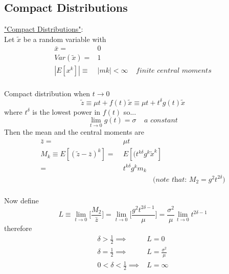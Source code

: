 \documentclass[
14pt,notheorems,hyperref={pdfauthor=whatever}
]{beamer}
\begin{document}
\subsection{Compact Distributions}

\begin{frame}
\underline{"Compact Distributions"}:\\
\hfill\break
Let $\tilde x$ be a random variable with\\
\begin{align*}
    \bar x =& 0\\
    Var(\tilde x) =& 1\\
    |E[x^k]| \equiv& |mk| < \infty \;\;\;\; \textit{finite central moments}\\
\end{align*}
\end{frame}

\begin{frame}
Compact distribution when $t \to 0$\\
\[\tilde z \equiv \mu t + f(t)\tilde x \equiv \mu t + t^\delta g(t) \tilde x\]
where $t^\delta$ is the lowest power in $f(t)$ so...\\
\[\lim_{t \to 0} g(t) = \sigma \;\;\;\; \textit{a constant}\]
Then the mean and the central moments are\\
\begin{align*}
    \bar z =&\; \mu t\\
    M_k \equiv E[(\tilde z - \bar z)^k] =&\; E[(t^{k\delta}g^k \tilde x^k]\\
    =&\; t^{k\delta}g^k m_k\\
    &\;\;\;\;\;\;\;\;\;\;\;\;\;\;\;\;\textit{(note that: $M_2 = g^2 t^{2\delta}$)}\\
\end{align*}
\end{frame}

\begin{frame}
Now define\\
\[L \equiv \lim_{t \to 0}\Bigg[\frac{M_2}{\bar z}\Bigg] = \lim_{t \to 0}\Bigg[\frac{g^2 t^{2\delta-1}}{\mu}\Bigg] = \frac{\sigma^2}{\mu}\lim_{t\to0}t^{2\delta-1}\]
therefore\\
\begin{align*}
    \delta>\frac{1}{2} \implies& L=0\\
    \delta=\frac{1}{2} \implies& L=\frac{\sigma^2}{\mu}\\
    0<\delta<\frac{1}{2} \implies& L=\infty\\
\end{align*}
\end{frame}
\end{document}
